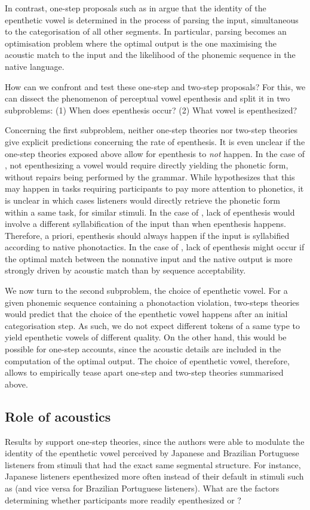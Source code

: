 In contrast, one-step proposals such as in \cite{dupoux2011} argue that the identity of the epenthetic vowel is determined in the process of parsing the input, simultaneous to the categorisation of all other segments. In particular, parsing becomes an optimisation problem where the optimal output is the one maximising the acoustic match to the input and the likelihood of the phonemic sequence in the native language.

How can we confront and test these one-step and two-step proposals? For this, we can dissect the phenomenon of perceptual vowel epenthesis and split it in two subproblems: (1) When does epenthesis occur? (2) What vowel is epenthesized?

Concerning the first subproblem, neither one-step theories nor two-step theories give explicit predictions concerning the rate of epenthesis. It is even unclear if the one-step theories exposed above allow for epenthesis to \textit{not} happen. In the case of \cite{berent2007}, not epenthesizing a vowel would require directly yielding the phonetic form, without repairs being performed by the grammar. While \cite{berent2007} hypothesizes that this may happen in tasks requiring participants to pay more attention to phonetics, it is unclear in which cases listeners would directly retrieve the phonetic form within a same task, for similar stimuli. In the case of \cite{monahan2009}, lack of epenthesis would involve a different syllabification of the input than when epenthesis happens. Therefore, a priori, epenthesis should always happen if the input is syllabified according to native phonotactics. In the case of \cite{dupoux2011}, lack of epenthesis might occur if the optimal match between the nonnative input and the native output is more strongly driven by acoustic match than by sequence acceptability.   

We now turn to the second subproblem, the choice of epenthetic vowel. For a given phonemic sequence containing a phonotaction violation, two-steps theories would predict that the choice of the epenthetic vowel happens after an initial categorisation step. As such, we do not expect different tokens of a same type to yield epenthetic vowels of different quality. On the other hand, this would be possible for one-step accounts, since the acoustic details are included in the computation of the optimal output. The choice of epenthetic vowel, therefore, allows to empirically tease apart one-step and two-step theories summarised above.      

\subsection{Role of acoustics}
Results by \cite{dupoux2011} support one-step theories, since the authors were able to modulate the identity of the epenthetic vowel perceived by Japanese and Brazilian Portuguese listeners from stimuli that had the exact same segmental structure. For instance, Japanese listeners epenthesized  more often instead of their default  in stimuli such as  (and vice versa for Brazilian Portuguese listeners). What are the factors determining whether participants more readily epenthesized  or ?


